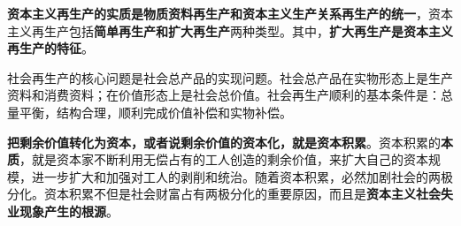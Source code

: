 \textbf{资本主义再生产的实质是物质资料再生产和资本主义生产关系再生产的统一}，资本主义再生产包括\textbf{简单再生产和扩大再生产}两种类型。其中，\textbf{扩大再生产是资本主义再生产的特征}。

社会再生产的核心问题是社会总产品的实现问题。社会总产品在实物形态上是生产资料和消费资料；在价值形态上是社会总价值。社会再生产顺利的基本条件是：总量平衡，结构合理，顺利完成价值补偿和实物补偿。

\textbf{把剩余价值转化为资本，或者说剩余价值的资本化，就是资本积累}{。资本积累的}\textbf{本质}{，}就是资本家不断利用无偿占有的工人创造的剩余价值，来扩大自己的资本规模，进一步扩大和加强对工人的剥削和统治。随着资本积累，必然加剧社会的两极分化。{资本积累不但是社会财富占有两极分化的重要原因，而且是}\textbf{资本主义社会失业现象产生的根源}{。}
